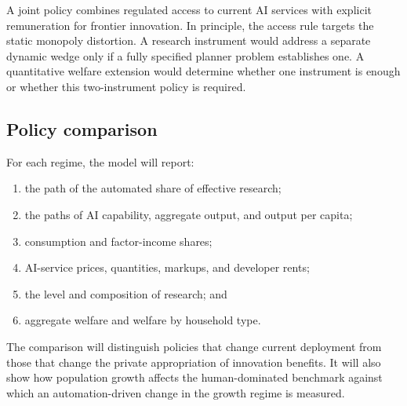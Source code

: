 A joint policy combines regulated access to current AI services with explicit
remuneration for frontier innovation. In principle, the access rule targets the
static monopoly distortion. A research instrument would address a separate dynamic
wedge only if a fully specified planner problem establishes one. A quantitative
welfare extension would determine whether one instrument is enough or whether this
two-instrument policy is required.

\subsection{Policy comparison}

For each regime, the model will report:
\begin{enumerate}[label=(\roman*)]
    \item the path of the automated share of effective research;
    \item the paths of AI capability, aggregate output, and output per capita;
    \item consumption and factor-income shares;
    \item AI-service prices, quantities, markups, and developer rents;
    \item the level and composition of research; and
    \item aggregate welfare and welfare by household type.
\end{enumerate}
The comparison will distinguish policies that change current deployment from those
that change the private appropriation of innovation benefits. It will also show how
population growth affects the human-dominated benchmark against which an
automation-driven change in the growth regime is measured.
